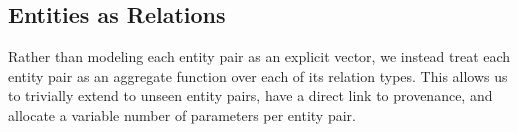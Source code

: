 \subsection {Entities as Relations}

Rather than modeling each entity pair as an explicit vector, we instead treat each entity pair as an aggregate function over each of its relation types.
This allows us to trivially extend to unseen entity pairs, have a direct link to provenance, and allocate a variable number of parameters per entity pair.